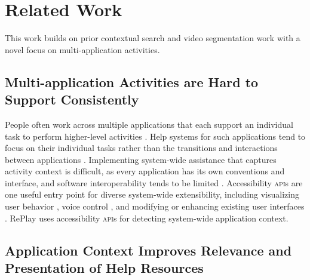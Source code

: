 \section{Related Work}
This work builds on prior contextual search and video segmentation work with a novel focus on multi-application activities.

\subsection{Multi-application Activities are Hard to Support Consistently}
People often work across multiple applications that each support an individual task to perform higher-level activities \cite{Sumner1997}. Help systems for such applications tend to focus on their individual tasks rather than the transitions and interactions between applications \cite{Norman2005}. Implementing system-wide assistance that captures activity context is difficult, as every application has its own conventions and interface, and software interoperability tends to be limited \cite{Beaudouin-Lafon2018}. Accessibility \textsc{api}s are one useful entry point for diverse system-wide extensibility, including visualizing user behavior \cite{Matejka2013}, voice control \cite{Li2017, Zhong2014}, and modifying or enhancing existing user interfaces \cite{Dixon2014, Stuerzlinger2006, Chang2011}.
RePlay uses accessibility \textsc{api}s for detecting system-wide application context.

\subsection{Application Context Improves Relevance and Presentation of Help Resources}

